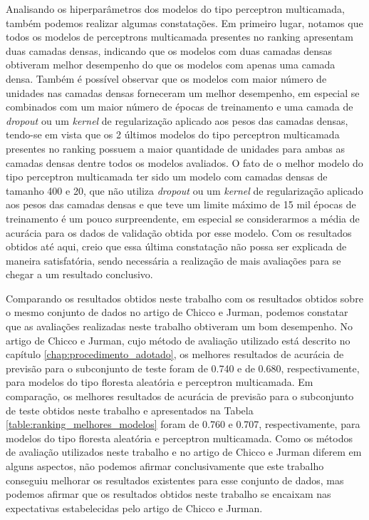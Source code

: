 Analisando os hiperparâmetros dos modelos do tipo perceptron multicamada, também podemos realizar algumas constatações. Em primeiro lugar, notamos que todos os modelos de perceptrons multicamada presentes no ranking apresentam duas camadas densas, indicando que os modelos com duas camadas densas obtiveram melhor desempenho do que os modelos com apenas uma camada densa. Também é possível observar que os modelos com maior número de unidades nas camadas densas forneceram um melhor desempenho, em especial se combinados com um maior número de épocas de treinamento e uma camada de \textit{dropout} ou um \textit{kernel} de regularização aplicado aos pesos das camadas densas, tendo-se em vista que os 2 últimos modelos do tipo perceptron multicamada presentes no ranking possuem a maior quantidade de unidades para ambas as camadas densas dentre todos os modelos avaliados. O fato de o melhor modelo do tipo perceptron multicamada ter sido um modelo com camadas densas de tamanho 400 e 20, que não utiliza \textit{dropout} ou um \textit{kernel} de regularização aplicado aos pesos das camadas densas e que teve um limite máximo de 15 mil épocas de treinamento é um pouco surpreendente, em especial se considerarmos a média de acurácia para os dados de validação obtida por esse modelo. Com os resultados obtidos até aqui, creio que essa última constatação não possa ser explicada de maneira satisfatória, sendo necessária a realização de mais avaliações para se chegar a um resultado conclusivo.

Comparando os resultados obtidos neste trabalho com os resultados obtidos sobre o mesmo conjunto de dados no artigo de Chicco e Jurman, podemos constatar que as avaliações realizadas neste trabalho obtiveram um bom desempenho. No artigo de Chicco e Jurman, cujo método de avaliação utilizado está descrito no capítulo \ref{chap:procedimento_adotado}, os melhores resultados de acurácia de previsão para o subconjunto de teste foram de 0.740 e de 0.680, respectivamente, para modelos do tipo floresta aleatória e perceptron multicamada. Em comparação, os melhores resultados de acurácia de previsão para o subconjunto de teste obtidos neste trabalho e apresentados na Tabela \ref{table:ranking_melhores_modelos} foram de 0.760 e 0.707, respectivamente, para modelos do tipo floresta aleatória e perceptron multicamada. Como os métodos de avaliação utilizados neste trabalho e no artigo de Chicco e Jurman diferem em alguns aspectos, não podemos afirmar conclusivamente que este trabalho conseguiu melhorar os resultados existentes para esse conjunto de dados, mas podemos afirmar que os resultados obtidos neste trabalho se encaixam nas expectativas estabelecidas pelo artigo de Chicco e Jurman.

